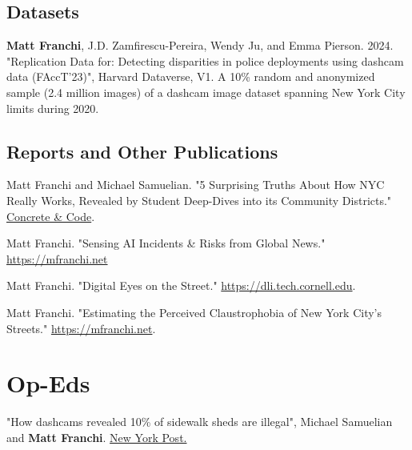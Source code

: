 \documentclass[10pt,letterpaper]{report}
\begin{document}
    \subsection*{Datasets}
    \begin{tablist}
        \item[2024.a] \tab{}\textbf{Matt Franchi}, J.D. Zamfirescu-Pereira, Wendy Ju, and Emma Pierson. 2024. "Replication Data for: Detecting disparities in police deployments using dashcam data (FAccT'23)", Harvard Dataverse, V1. \newline A 10\% random and anonymized sample (2.4 million images) of a dashcam image dataset spanning \newline New York City limits during 2020.
    \end{tablist}

     
    \subsection*{Reports and Other Publications}

    \begin{tablist}

        \item[2026.a] \tab{}Matt Franchi and Michael Samuelian. "5 Surprising Truths About How NYC Really Works, Revealed by Student Deep-Dives into its Community Districts." \href{https://concreteandcode.substack.com/p/5-surprising-truths-about-how-nyc}{Concrete \& Code}.

        \item[2025.b] \tab{}Matt Franchi. "Sensing AI Incidents \& Risks from Global News." \href{https://mfranchi.net/posts/uair-brief/}{https://mfranchi.net}

        \item[2025.a] \tab{}Matt Franchi. "Digital Eyes on the Street." \href{https://dli.tech.cornell.edu/post/digital-eyes-on-the-street}{https://dli.tech.cornell.edu}.

        \item[2024.a] \tab{}Matt Franchi. "Estimating the Perceived Claustrophobia of New York City's Streets." \href{https://mfranchi.net/posts/claustrophobic-streets/}{https://mfranchi.net}.

    \end{tablist}

   \clearpage
    \section*{Op-Eds}
        \begin{tablist}

            \item[2026.a] \tab{}"How dashcams revealed 10\% of sidewalk sheds are illegal", Michael Samuelian and \textbf{Matt Franchi}. \href{https://nypost.com/2026/02/13/opinion/how-to-shed-those-ugly-sheds-and-see-paradise-by-the-dashboard-camera/}{New York Post.}
            
        \end{tablist}
   
\end{document}
